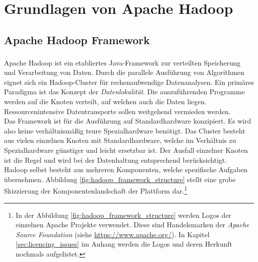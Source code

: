 \chapter{Grundlagen von Apache Hadoop\textsuperscript{\textregistered}}
\label{ch:theory_hadoop}

\section{Apache Hadoop Framework}
\label{sec:theory_hadoop}
\noindent
Apache Hadoop\textsuperscript{\textregistered} ist ein etabliertes Java-Framework zur verteilten Speicherung und Verarbeitung von Daten. Durch die parallele Ausführung von Algorithmen eignet sich ein Hadoop-Cluster für rechenaufwendige Datenanalysen. Ein primäres Paradigma ist das Konzept der \textit{Datenlokalität}. Die auszuführenden Programme werden auf die Knoten verteilt, auf welchen auch die Daten liegen. Ressourcenintensive Datentransporte sollen weitgehend vermieden werden.\cite[S. 20 ff.]{big_data_praxis}\\ 
Das Framework ist für die Ausführung auf Standardhardware konzipiert. Es wird also keine verhältnismäßig teure Spezialhardware benötigt. Das Cluster besteht aus vielen einzelnen Knoten mit Standardhardware, welche im Verhältnis zu Spezialhardware günstiger und leicht ersetzbar ist. Der Ausfall einzelner Knoten ist die Regel und wird bei der Datenhaltung entsprechend berücksichtigt. \\

\noindent
Hadoop selbst besteht aus mehreren Komponenten, welche spezifische Aufgaben übernehmen. Abbildung \ref{fig:hadoop_framework_structure} stellt eine grobe Skizzierung der Komponentenlandschaft der Plattform dar.\footnote{In der Abbildung \ref{fig:hadoop_framework_structure} werden Logos der einzelnen Apache Projekte verwendet. Diese sind Handelsmarken der \textit{Apache Source Foundation} (siehe \url{https://www.apache.org/}). In Kapitel \ref{sec:licencing_issues} im Anhang werden die Logos und deren Herkunft nochmals aufgelistet.}\\

